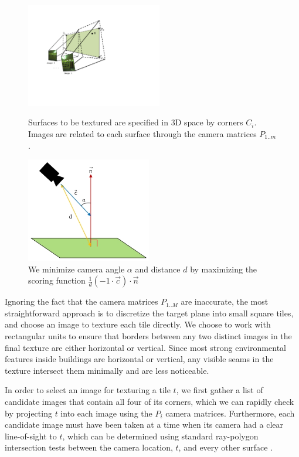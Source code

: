 \documentclass[]{spie}  %
\begin{document}
\begin{figure}
  \begin{minipage}[b]{0.45\linewidth}
    \centering
    \includegraphics[height=1.8in]{Projection.pdf}
    \caption{Surfaces to be textured are specified in 3D space by
      corners $C_i$. Images are related to each surface through the
      camera matrices $P_{1..m}$. }
    \label{fig:projection}
  \end{minipage}
  \hspace{0.5cm}
  \begin{minipage}[b]{0.45\linewidth}
    \centering
    \includegraphics[height=1.8in]{scoringFunction.jpg}
    \caption{We minimize camera angle $\alpha$ and distance $d$ by
      maximizing the scoring function $\frac{1}{d} (-1 \cdot \vec{c})
      \cdot \vec{n}$}
    \label{fig:scoringFunction}
  \end{minipage}
\end{figure}


Ignoring the fact that the camera matrices $P_{1..M}$ are inaccurate,
the most straightforward approach is to discretize the target plane
into small square tiles, and choose an image to texture each tile
directly. We choose to work with rectangular units to ensure that
borders between any two distinct images in the final texture are
either horizontal or vertical. Since most strong environmental
features inside buildings are horizontal or vertical, any visible
seams in the texture intersect them minimally and are less noticeable.

In order to select an image for texturing a tile $t$, we first gather
a list of candidate images that contain all four of its corners, which
we can rapidly check by projecting $t$ into each image using the $P_i$
camera matrices. Furthermore, each candidate image must have been
taken at a time when its camera had a clear line-of-sight to $t$,
which can be determined using standard ray-polygon intersection tests
between the camera location, $t$, and every other surface
\cite{rayintersection}.
\end{document}
